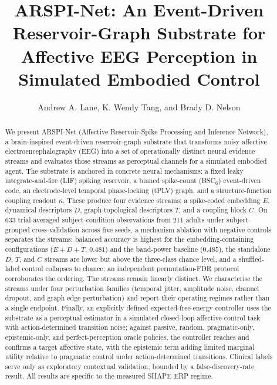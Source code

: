 \documentclass[journal]{IEEEtran}
\begin{document}
\title{ARSPI-Net: An Event-Driven Reservoir-Graph Substrate for Affective EEG Perception in Simulated Embodied Control}

\author{Andrew A. Lane, K. Wendy Tang, and Brady D. Nelson}

\maketitle

\begin{abstract}
We present ARSPI-Net (Affective Reservoir-Spike Processing and Inference Network), a brain-inspired event-driven reservoir-graph substrate that transforms noisy affective electroencephalography (EEG) into a set of operationally distinct neural evidence streams and evaluates those streams as perceptual channels for a simulated embodied agent. The substrate is anchored in concrete neural mechanisms: a fixed leaky integrate-and-fire (LIF) spiking reservoir, a binned spike-count (BSC$_6$) event-driven code, an electrode-level temporal phase-locking (tPLV) graph, and a structure-function coupling readout $\kappa$. These produce four evidence streams: a spike-coded embedding $E$, dynamical descriptors $D$, graph-topological descriptors $T$, and a coupling block $C$. On 633 trial-averaged subject-condition observations from 211 adults under subject-grouped cross-validation across five seeds, a mechanism ablation with negative controls separates the streams: balanced accuracy is highest for the embedding-containing configurations ($E{+}D{+}T$, $0.481$) and the band-power baseline ($0.485$), the standalone $D$, $T$, and $C$ streams are lower but above the three-class chance level, and a shuffled-label control collapses to chance; an independent permutation-FDR protocol corroborates the ordering. The streams remain linearly distinct. We characterise the streams under four perturbation families (temporal jitter, amplitude noise, channel dropout, and graph edge perturbation) and report their operating regimes rather than a single endpoint. Finally, an explicitly defined expected-free-energy controller uses the substrate as a perceptual estimator in a simulated closed-loop affective-control task with action-determined transition noise; against passive, random, pragmatic-only, epistemic-only, and perfect-perception oracle policies, the controller reaches and confirms a target affective state, with the epistemic term adding limited marginal utility relative to pragmatic control under action-determined transitions. Clinical labels serve only as exploratory contextual validation, bounded by a false-discovery-rate result. All results are specific to the measured SHAPE ERP regime.
\end{abstract}
\end{document}
